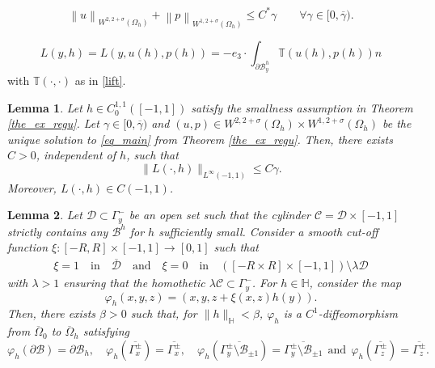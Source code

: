 \documentclass[10pt,a4paper]{amsart}
\newtheorem{lemma}{Lemma}
\begin{document}
\begin{equation}
\left\|u\right\|_{W^{2,2+\sigma }(\Omega_h)}+\left\|p\right\|_{W^{1,2+\sigma}(\Omega_h)}\le C^*\gamma \qquad \forall  \gamma\in[0, \overline{\gamma}).
\end{equation}

    \begin{equation}\label{load}
        L(y, h)=L(y, u(h), p(h)) = - e_3 \cdot \int_{\partial \mathcal{B}_y^h}\mathbb{T}(u(h), p(h)) n
    \end{equation} with $\mathbb{T}(\cdot, \cdot)$ as in \eqref{lift}.

\begin{lemma}\label{lem-Lbound}
Let $h\in C^{1,1}_0([-1,1])$ satisfy the smallness assumption in Theorem \ref{the_ex_regu}. Let $\gamma \in [0, \overline{\gamma})$ and $(u,p)\in W^{2,2+\sigma}(\Omega_h)\times W^{1,2+\sigma}(\Omega_h)$ be the unique solution to \eqref{eq_main} from Theorem \ref{the_ex_regu}. Then, there exists  $C>0$, independent of $h$,  such that
\begin{equation}\label{load-control}
\|L(\cdot, h)\|_{L^\infty(-1,1)}\leq C \gamma .
\end{equation}
Moreover, $L(\cdot, h)\in C(-1,1)$.
\end{lemma}

\begin{lemma}\label{lemma-diffeo}
Let $\mathcal{D}\subset \Gamma_y^-$ be an open set such that the cylinder $\mathcal{C}=\mathcal{D} \times [-1,1]$ strictly contains any $\mathcal{B}^h$ for $h$ sufficiently small. Consider a smooth cut-off function $\xi:[-R, R]\times [-1,1]\rightarrow [0,1]$ such that
\begin{equation}\label{cutoff-diffeo}\begin{aligned}\xi=1\quad  \text{in} \quad \overline{\mathcal{D}} \quad \text{and} \quad
\xi=0 \quad \text{in}\quad \left([-R\times R]\times [-1,1]\right)\setminus \lambda\mathcal{D}
    \end{aligned}
\end{equation}with $\lambda>1$ ensuring that the homothetic $\lambda \mathcal{C}\subset \Gamma_y^-$.
For $h\in \mathbb{H}$, consider the map
	\begin{equation}\label{diffeo}\varphi_h (x,y,z)= \left(x, y, z+ \xi(x,z)h(y)\right).\end{equation} Then, there exists $\beta>0$ such that, for $\|h\|_{\mathbb{H}}<\beta$,  $\varphi_h$ is a $C^1$-diffeomorphism from $\overline{\Omega}_0$ to $\overline{\Omega}_h$ satisfying \begin{equation}\label{diff-prop}
			\varphi_h (\partial\mathcal{B})=\partial\mathcal{B}_h , \quad \varphi_h (\overline{\Gamma_x^\pm })=\overline{\Gamma_x^\pm},
           \quad \varphi_h (\overline{\Gamma_y^\pm \setminus \mathcal{B}_{\pm 1} })=\overline{\Gamma_y^\pm \setminus \mathcal{B}_{\pm 1} } \ \
              \text{and} \ \ \varphi_h (\overline{\Gamma_z^\pm })=\overline{\Gamma_z^\pm}.
            \end{equation}
\end{lemma}
\end{document}
